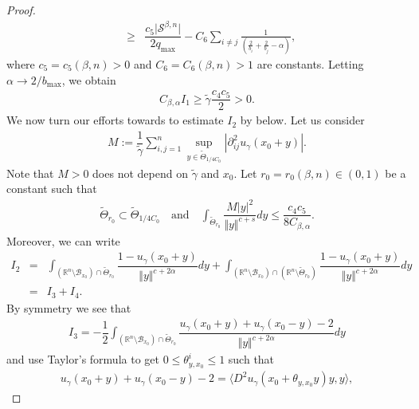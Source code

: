 \documentclass[10pt, leqno]{article}
\theoremstyle{definition}
\theoremstyle{remark}
\numberwithin{equation}{section}
\begin{document}
\begin{proof}
\begin{eqnarray}
&\geq & \dfrac{c_{5}\vert \mathcal{S}^{\beta,n}_{} \vert}{2q_{\max}} - C_{6}\sum_{i\neq j}^{}\frac{1}{\left(\frac{2}{b_{i}} + \frac{2}{b_{j}} - \alpha \right)},
\end{eqnarray}
where $c_{5}=c_{5}(\beta, n)> 0$ and $C_{6} = C_{6}(\beta, n)> 1$ are constants. Letting $\alpha \rightarrow 2/ b_{\max}$, we obtain
\begin{eqnarray}
\label{barrier function inequality 2}
C_{\beta, \alpha} I_{1} \geq \tilde{\gamma} \dfrac{c_{4}c_{5}}{2}>0.
\end{eqnarray}
We now turn our efforts towards to estimate $I_{2}$ by below. Let us consider
\begin{eqnarray}
M := \dfrac{1}{\tilde{\gamma}}\sum_{i,j=1}^{n} \sup_{y \in \tilde{\Theta}_{1/4C_{0}}} \left | \partial^{2}_{ij}u_{\gamma}(x_{0} + y)\right|.
\end{eqnarray}
Note that $M >0$ does not depend on $\tilde{\gamma}$ and $x_{0}$. Let $r_{0} = r_{0}(\beta, n)  \in (0, 1)$ be a constant such that
\begin{eqnarray}
\label{barrier function inequality 3}
\tilde{\Theta}_{r_{0}} \subset \tilde{\Theta}_{1/4C_{0}} \quad \text{and} \quad \int_{\tilde{\Theta}_{r_{0}}} \dfrac{ M \vert y \vert^{2}}{ \Vert y \Vert^{c+s}} dy \leq \dfrac{c_{4}c_{5}}{8 C_{\beta, \alpha}}.
\end{eqnarray}
Moreover, we can write
\begin{eqnarray}
\label{barrier function inequality 4}
I_{2} & = & \displaystyle \int_{\left(\mathbb{R}^{n} \setminus \mathcal{B}_{x_{0}}\right) \cap \tilde{\Theta}_{r_{0}}} \dfrac{1 - u_{\gamma}\left( x_{0} + y\right)}{\Vert y \Vert^{c_{} + 2\alpha}} dy + \displaystyle \int_{\left(\mathbb{R}^{n} \setminus \mathcal{B}_{x_{0}}\right) \cap \left(\mathbb{R}^{n} \setminus \tilde{\Theta}_{r_{0}} \right)} \dfrac{1 - u_{\gamma}\left( x_{0} + y\right)}{\Vert y \Vert^{c_{} + 2\alpha}} dy \\ \nonumber
& = & I_{3} + I_{4}.
\end{eqnarray}
By symmetry we see that
\begin{eqnarray}
I_{3} = -\dfrac{1}{2}\displaystyle \int_{\left(\mathbb{R}^{n} \setminus \mathcal{B}_{x_{0}}\right) \cap \tilde{\Theta}_{r_{0}}} \dfrac{u_{\gamma}\left( x_{0} + y\right) + u_{\gamma}\left( x_{0} - y\right) - 2}{\Vert y \Vert^{c_{} + 2\alpha}} dy
\end{eqnarray}
and use Taylor's formula to get $0 \leq \theta^{i}_{y,x_{0}} \leq 1$ such that
\begin{eqnarray}
u_{\gamma}(x_{0} + y) + u_{\gamma}(x_{0} - y) - 2 = \langle D^{2}u_{\gamma}(x_{0} + \theta_{y,x_{0}}y)y, y \rangle,

\end{eqnarray}
\end{proof}
\end{document}
